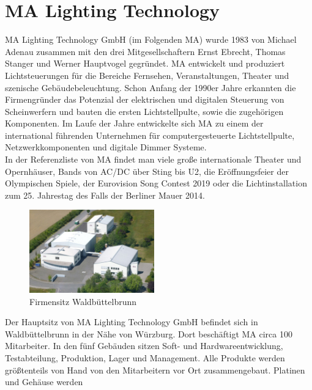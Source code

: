 \documentclass[11pt]{scrartcl}
\begin{document}
\section{MA Lighting Technology}
MA Lighting Technology GmbH (im Folgenden MA) wurde 1983 von Michael Adenau zusammen mit
den drei Mitgesellschaftern Ernst Ebrecht, Thomas Stanger und Werner Hauptvogel gegründet. MA
entwickelt und produziert Lichtsteuerungen für die Bereiche Fernsehen, Veranstaltungen, Theater
und szenische Gebäudebeleuchtung. Schon Anfang der 1990er Jahre erkannten die Firmengründer
das Potenzial der elektrischen und digitalen Steuerung von Scheinwerfern und bauten die ersten
Lichtstellpulte, sowie die zugehörigen Komponenten. Im Laufe der Jahre entwickelte sich MA zu
einem der international führenden Unternehmen für computergesteuerte Lichtstellpulte,
Netzwerkkomponenten und digitale Dimmer Systeme.\\
In der Referenzliste von MA findet man viele große internationale Theater und Opernhäuser, Bands
von AC/DC über Sting bis U2, die Eröffnungsfeier der Olympischen Spiele, der Eurovision Song
Contest 2019 oder die Lichtinstallation zum 25. Jahrestag des Falls der Berliner Mauer 2014.\\
\begin{figure}
    \vspace{-25pt}
    \begin{center}
        \includegraphics[width=0.48\textwidth]{images/csm_MA_building_WBB.jpg}
    \end{center}
    \vspace{-20pt}
    \caption{Firmensitz Waldbüttelbrunn}
    \vspace{-15pt}
\end{figure}
Der Hauptsitz von MA Lighting Technology GmbH befindet sich in Waldbüttelbrunn in der Nähe von
Würzburg. Dort beschäftigt MA circa 100 Mitarbeiter. In den fünf Gebäuden sitzen Soft- und
Hardwareentwicklung, Testabteilung, Produktion, Lager und Management. Alle Produkte werden
größtenteils von Hand von den Mitarbeitern vor Ort zusammengebaut. Platinen und Gehäuse werden
\end{document}
